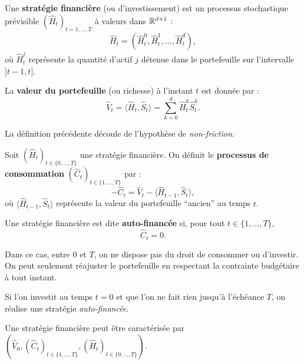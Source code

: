 \begin{definition}
Une \textbf{stratégie financière} (ou d'investissement) est un processus stochastique prévisible $(\hat H_t)_{t=1,\ldots,T}$ à valeurs dans $\mathbb{R}^{d+1}$ :
\begin{equation}
\hat H_t = (\hat H_t^0, \hat H_t^1, \ldots, \hat H_t^d),
\end{equation}
où $\hat H_t^j$ représente la quantité d'actif $j$ détenue dans le portefeuille sur l'intervalle $]t-1, t]$.

La \textbf{valeur du portefeuille} (ou richesse) à l'instant $t$ est donnée par :
\begin{equation}
\hat V_t = \langle \hat H_t, \hat S_t \rangle = \sum_{k=0}^d \hat H_t^k \hat S_t^k.
\end{equation}
\end{definition}

\begin{remarque}
La définition précédente découle de l'hypothèse de \emph{non-friction}.
\end{remarque}

\begin{definition}
Soit $(\hat H_t)_{t\in\{0,\ldots,T\}}$ une stratégie financière.  
On définit le \textbf{processus de consommation} $(\hat C_t)_{t\in\{1,\ldots,T\}}$ par :
\[
-\hat C_t = \hat V_t - \langle \hat H_{t-1}, \hat S_t \rangle,
\]
où $\langle \hat H_{t-1}, \hat S_t \rangle$ représente la valeur du portefeuille ``ancien'' au temps $t$.

Une stratégie financière est dite \textbf{auto-financée} si, pour tout $t\in\{1,\ldots,T\}$,
\[
\hat C_t = 0.
\]
\end{definition}

\medskip

Dans ce cas, entre $0$ et $T$, on ne dispose pas du droit de consommer ou d'investir.  
On peut seulement réajuster le portefeuille en respectant la contrainte budgétaire à tout instant.

\begin{exemple}
Si l'on investit au temps $t=0$ et que l'on ne fait rien jusqu'à l'échéance $T$, on réalise une stratégie \emph{auto-financée}.
\end{exemple}

\begin{lemme}
Une stratégie financière peut être caractérisée par $(\hat V_0, (\hat C_t)_{t\in\{1,\ldots,T\}}, (\hat H_t)_{t\in\{0,\ldots,T\}})$.
\end{lemme}

